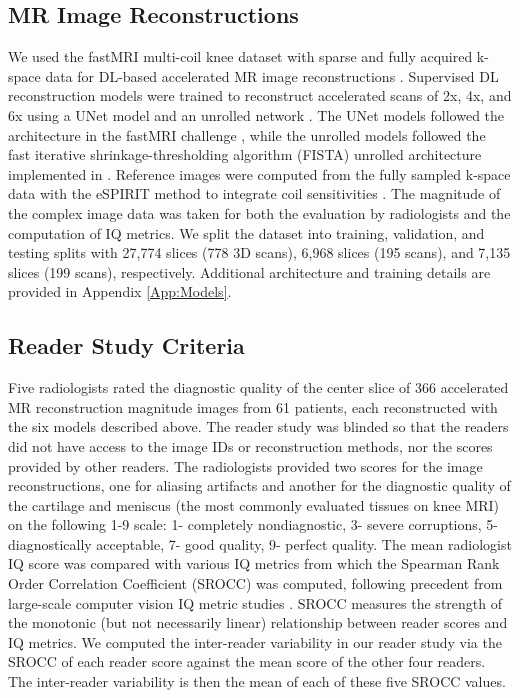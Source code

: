 \documentclass[AMA,STIX2COL,Linenumberson]{MRM}
\begin{document}
\subsection{MR Image Reconstructions}
\label{sub:Recons}
We used the fastMRI multi-coil knee dataset with sparse and fully acquired k-space data for DL-based accelerated MR image reconstructions \cite{Knoll2020tp}. Supervised DL reconstruction models were trained to reconstruct accelerated scans of 2x, 4x, and 6x using a UNet model and an unrolled network \cite{sandino2020compressed}. The UNet models followed the architecture in the fastMRI challenge \cite{Knoll2020tp}, while the unrolled models followed the fast iterative shrinkage-thresholding algorithm (FISTA) unrolled architecture \cite{xin2023fista} implemented in \cite{sandino2020compressed}.  Reference images were computed from the fully sampled k-space data with the eSPIRIT method to integrate coil sensitivities \cite{uecker2014espirit}. The magnitude of the complex image data was taken for both the evaluation by radiologists and the computation of IQ metrics. We split the dataset into training, validation, and testing splits with 27,774 slices (778 3D scans), 6,968 slices (195 scans), and 7,135 slices (199 scans), respectively. Additional architecture and training details are provided in Appendix \ref{App:Models}.

\subsection{Reader Study Criteria}\label{Methods:RS}
Five radiologists rated the diagnostic quality of the center slice of 366 accelerated MR reconstruction magnitude images from 61 patients, each reconstructed with the six models described above. The reader study was blinded so that the readers did not have access to the image IDs or reconstruction methods, nor the scores provided by other readers. The radiologists provided two scores for the image reconstructions, one for aliasing artifacts and another for the diagnostic quality of the cartilage and meniscus (the most commonly evaluated tissues on knee MRI) on the following 1-9 scale: 1- completely nondiagnostic, 3- severe corruptions, 5- diagnostically acceptable, 7- good quality, 9- perfect quality. The mean radiologist IQ score was compared with various IQ metrics from which the Spearman Rank Order Correlation Coefficient (SROCC) was computed, following precedent from large-scale computer vision IQ metric studies \cite{gu2022ntire}. SROCC measures the strength of the monotonic (but not necessarily linear) relationship between reader scores and IQ metrics. We computed the inter-reader variability in our reader study via the SROCC of each reader score against the mean score of the other four readers. The inter-reader variability is then the mean of each of these five SROCC values.
\end{document}
